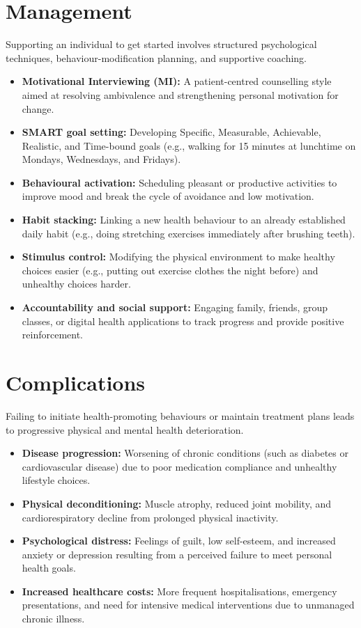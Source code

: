 \section*{Management}
Supporting an individual to get started involves structured psychological techniques, behaviour-modification planning, and supportive coaching.
\begin{itemize}
    \item \textbf{Motivational Interviewing (MI):} A patient-centred counselling style aimed at resolving ambivalence and strengthening personal motivation for change.
    \item \textbf{SMART goal setting:} Developing Specific, Measurable, Achievable, Realistic, and Time-bound goals (e.g., walking for 15 minutes at lunchtime on Mondays, Wednesdays, and Fridays).
    \item \textbf{Behavioural activation:} Scheduling pleasant or productive activities to improve mood and break the cycle of avoidance and low motivation.
    \item \textbf{Habit stacking:} Linking a new health behaviour to an already established daily habit (e.g., doing stretching exercises immediately after brushing teeth).
    \item \textbf{Stimulus control:} Modifying the physical environment to make healthy choices easier (e.g., putting out exercise clothes the night before) and unhealthy choices harder.
    \item \textbf{Accountability and social support:} Engaging family, friends, group classes, or digital health applications to track progress and provide positive reinforcement.
\end{itemize}

\section*{Complications}
Failing to initiate health-promoting behaviours or maintain treatment plans leads to progressive physical and mental health deterioration.
\begin{itemize}
    \item \textbf{Disease progression:} Worsening of chronic conditions (such as diabetes or cardiovascular disease) due to poor medication compliance and unhealthy lifestyle choices.
    \item \textbf{Physical deconditioning:} Muscle atrophy, reduced joint mobility, and cardiorespiratory decline from prolonged physical inactivity.
    \item \textbf{Psychological distress:} Feelings of guilt, low self-esteem, and increased anxiety or depression resulting from a perceived failure to meet personal health goals.
    \item \textbf{Increased healthcare costs:} More frequent hospitalisations, emergency presentations, and need for intensive medical interventions due to unmanaged chronic illness.
\end{itemize}

